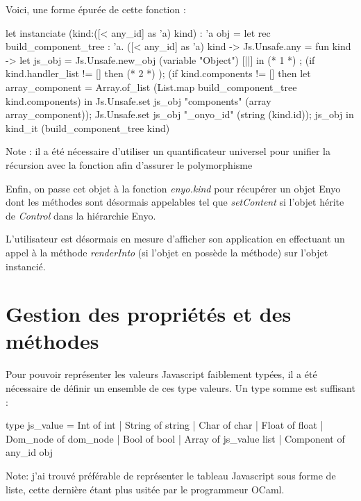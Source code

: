 \documentclass[11pt,a4paper]{report}
\begin{document}
Voici, une forme épurée de cette fonction :

\begin{OCaml}
    let instanciate (kind:([< any_id] as 'a) kind) : 'a obj =
      let rec build_component_tree : 'a. ([< any_id] as 'a) kind -> Js.Unsafe.any = fun kind ->
          let js_obj = Js.Unsafe.new_obj (variable "Object") [||]
          in
          (* 1 *)
          ;
          (if kind.handler_list != [] then
              (* 2 *)
          );
          (if kind.components != []  then
              let array_component = Array.of_list (List.map build_component_tree kind.components) in
	      Js.Unsafe.set js_obj "components" (array array_component));
          Js.Unsafe.set js_obj "_onyo_id" (string (kind.id));
          js_obj in
       kind_it (build_component_tree kind)
\end{OCaml}

Note : il a été nécessaire d'utiliser un quantificateur universel pour unifier la récursion 
avec la fonction afin d'assurer le polymorphisme\\\medskip

Enfin, on passe cet objet à la fonction \emph{enyo.kind} pour récupérer un objet Enyo
dont les méthodes sont désormais appelables tel que \emph{setContent} si l'objet hérite 
de \emph{Control} dans la hiérarchie Enyo.

L'utilisateur est désormais en mesure d'afficher son application en effectuant un appel
à la méthode \emph{renderInto} (si l'objet en possède la méthode) sur l'objet instancié.

\section{Gestion des propriétés et des méthodes}\label{gestprop}

Pour pouvoir représenter les valeurs Javascript faiblement typées, il a été nécessaire de définir un 
ensemble de ces type valeurs. Un type somme est suffisant :

\begin{OCaml}
    type js_value = Int of int | String of string 
                  | Char of char | Float of float 
                  | Dom_node of dom_node | Bool of bool 
                  | Array of js_value list | Component of any_id obj 
\end{OCaml}

Note: j'ai trouvé préférable de représenter le tableau Javascript sous forme de liste,
cette dernière étant plus usitée par le programmeur OCaml.\medskip
\end{document}
